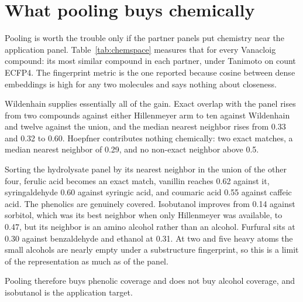 
\section{What pooling buys chemically}
\label{sec:chemistry}

Pooling is worth the trouble only if the partner panels put chemistry near the application
panel. Table~\ref{tab:chemspace} measures that for every Vanacloig compound: its most similar
compound in each partner, under Tanimoto on count ECFP4. The fingerprint metric is the one
reported because cosine between dense embeddings is high for any two molecules and says
nothing about closeness.

\begin{table}[htbp]
\centering
\footnotesize
\caption{Coverage of the 41-compound Vanacloig panel by each partner. Exact counts identical
InChIKeys; the median nearest neighbor and the threshold counts use non-exact neighbors only,
so an exact match cannot inflate them.}
\label{tab:chemspace}

\end{table}

Wildenhain supplies essentially all of the gain. Exact overlap with the panel rises from two
compounds against either Hillenmeyer arm to ten against Wildenhain and twelve against the
union, and the median nearest neighbor rises from 0.33 and 0.32 to 0.60. Hoepfner contributes
nothing chemically: two exact matches, a median nearest neighbor of 0.29, and no non-exact
neighbor above 0.5.

Sorting the hydrolysate panel by its nearest neighbor in the union of the other four, ferulic
acid becomes an exact match, vanillin reaches 0.62 against it, syringaldehyde 0.60 against
syringic acid, and coumaric acid 0.55 against caffeic acid. The phenolics are genuinely
covered. Isobutanol improves from 0.14 against sorbitol, which was its best neighbor when only
Hillenmeyer was available, to 0.47, but its neighbor is an amino alcohol rather than an
alcohol. Furfural sits at 0.30 against benzaldehyde and ethanol at 0.31. At two and five heavy
atoms the small alcohols are nearly empty under a substructure fingerprint, so this is a limit
of the representation as much as of the panel.

Pooling therefore buys phenolic coverage and does not buy alcohol coverage, and isobutanol is
the application target.
